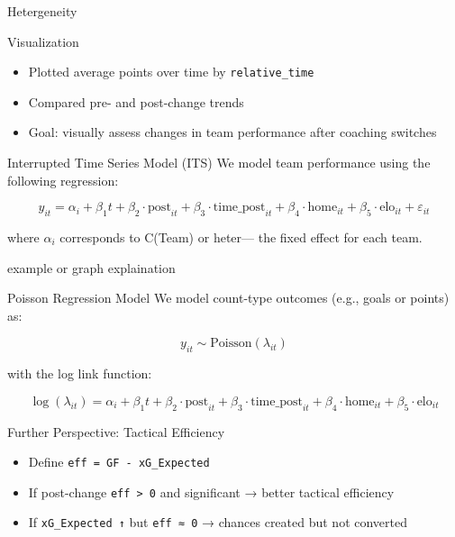 \documentclass[
  ignorenonframetext,
]{beamer}
\providecommand{\tightlist}{%
  \setlength{\itemsep}{0pt}\setlength{\parskip}{0pt}}\usepackage{longtable,booktabs,array}
\begin{document}
\begin{frame}{Hetergeneity}
\label{hetergeneity}
\end{frame}

\begin{frame}[fragile]{Visualization}
\label{visualization}
\begin{itemize}
\tightlist
\item
  Plotted average points over time by \texttt{relative\_time}
\item
  Compared pre- and post-change trends
\item
  Goal: visually assess changes in team performance after coaching
  switches
\end{itemize}
\end{frame}

\begin{frame}{Interrupted Time Series Model (ITS)}
\label{interrupted-time-series-model-its}
We model team performance using the following regression:

\[
y_{it} = \alpha_i + \beta_1 t + \beta_2 \cdot \text{post}_{it} + \beta_3 \cdot \text{time\_post}_{it} + \beta_4 \cdot \text{home}_{it} + \beta_5 \cdot \text{elo}_{it} + \varepsilon_{it}
\]

where \(\alpha_i\) corresponds to C(Team) or heter--- the fixed effect
for each team.

example or graph explaination
\end{frame}

\begin{frame}{Poisson Regression Model}
\label{poisson-regression-model}
We model count-type outcomes (e.g., goals or points) as:

\[
y_{it} \sim \text{Poisson}(\lambda_{it})
\]

with the log link function:

\[
\log(\lambda_{it}) = \alpha_i + \beta_1 t + \beta_2 \cdot \text{post}_{it} + \beta_3 \cdot \text{time\_post}_{it} + \beta_4 \cdot \text{home}_{it} + \beta_5 \cdot \text{elo}_{it}
\]
\end{frame}

\begin{frame}[fragile]{Further Perspective: Tactical Efficiency}
\label{further-perspective-tactical-efficiency}
\begin{itemize}
\tightlist
\item
  Define \texttt{eff\ =\ GF\ -\ xG\_Expected}
\item
  If post-change \texttt{eff\ \textgreater{}\ 0} and significant →
  better tactical efficiency
\item
  If \texttt{xG\_Expected\ ↑} but \texttt{eff\ ≈\ 0} → chances created
  but not converted
\end{itemize}
\end{frame}
\end{document}
